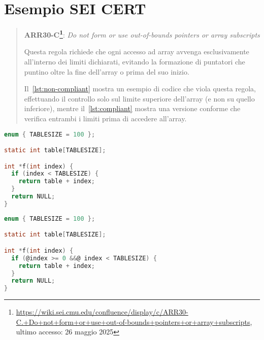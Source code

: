 \chapter{Esempio SEI CERT}
\label{appendix:sei_cert}

\begin{quote}
  \textbf{ARR30-C\protect\footnote{\url{https://wiki.sei.cmu.edu/confluence/display/c/ARR30-C.+Do+not+form+or+use+out-of-bounds+pointers+or+array+subscripts},
  ultimo accesso: 26 maggio 2025}}: \textit{Do not form or use out-of-bounds
  pointers or array subscripts}

  Questa regola richiede che ogni accesso ad array avvenga esclusivamente all'interno
  dei limiti dichiarati, evitando la formazione di puntatori che puntino oltre
  la fine dell'array o prima del suo inizio.

  \noindent
  Il~\autoref{lst:non-compliant} mostra un esempio di codice che viola questa
  regola, effettuando il controllo solo sul limite superiore dell'array (e non
  su quello inferiore), mentre il~\autoref{lst:compliant} mostra una versione
  conforme che verifica entrambi i limiti prima di accedere all'array.
\end{quote}


\begin{minipage}[t]{0.4\textwidth}
  \begin{lstlisting}[language=C, caption={Codice \textit{Non-Compliant}}, label={lst:non-compliant}]
enum { TABLESIZE = 100 };

static int table[TABLESIZE];

int *f(int index) {
  if (index < TABLESIZE) {
    return table + index;
  }
  return NULL;
}
\end{lstlisting}
\end{minipage}
\hfill
\begin{minipage}[t]{0.5\textwidth}
  \begin{lstlisting}[language=C, caption={Codice \textit{Compliant}}, label={lst:compliant}, style=changes_in_c]
enum { TABLESIZE = 100 };

static int table[TABLESIZE];

int *f(int index) {
  if (@index >= 0 &&@ index < TABLESIZE) {
    return table + index;
  }
  return NULL;
}
\end{lstlisting}
\end{minipage}